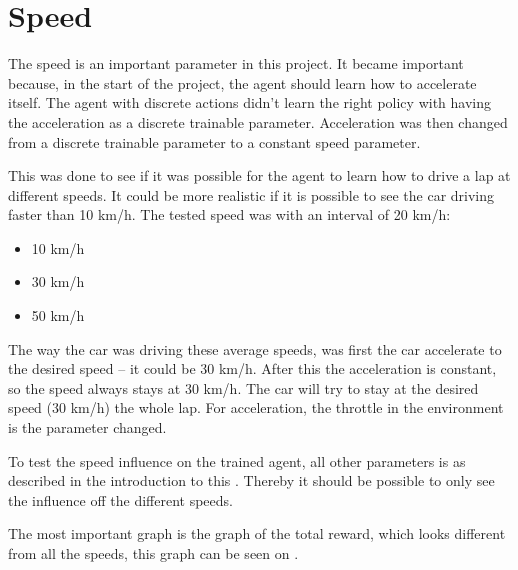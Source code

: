\section{Speed}\label{sectionAcceleration}
The speed is an important parameter in this project. It became important because, in the start of the project, the agent should learn how to accelerate itself. The agent with discrete actions didn't learn the right policy with having the acceleration as a discrete trainable parameter. Acceleration was then changed from a discrete trainable parameter to a constant speed parameter. 

This was done to see if it was possible for the agent to learn how to drive a lap at different speeds. It could be more realistic if it is possible to see the car driving faster than 10 km/h. The tested speed was with an interval of 20 km/h: 
\begin{itemize}
	\item 10 km/h
	\item 30 km/h
	\item 50 km/h
\end{itemize} 

The way the car was driving these average speeds, was first the car accelerate to the desired speed – it could be 30 km/h. After this the acceleration is constant, so the speed always stays at 30 km/h. The car will try to stay at the desired speed (30 km/h) the whole lap. For acceleration, the throttle in the environment is the parameter changed. 

To test the speed influence on the trained agent, all other parameters is as described in the introduction to this . Thereby it should be possible to only see the influence off the different speeds. 

The most important graph is the graph of the total reward, which looks different from all the speeds, this graph can be seen on .

